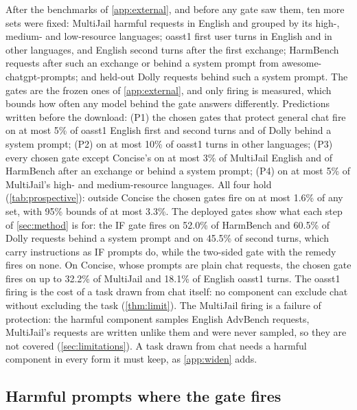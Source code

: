 \documentclass{article}
\theoremstyle{plain}
\theoremstyle{definition}
\theoremstyle{remark}
\newcommand{\resdir}{latex_v2_results}%
\newcommand{\placeholder}[1]{\begin{center}\fbox{\parbox[c][1.6cm][c]{0.9\linewidth}{\centering\small
  \textcolor{blue!60!black}{#1}}}\end{center}}
\newcommand{\inputor}[2]{\IfFileExists{#1}{}{\placeholder{#2}}}
\begin{document}
After the benchmarks of \cref{app:external}, and before any gate saw them, ten more sets were fixed: MultiJail harmful requests \citep{deng2024multilingual} in English and
grouped by its high-, medium- and low-resource languages; oasst1 first user turns \citep{kopf2023openassistant} in
English and in other languages, and English second turns after the first exchange; HarmBench requests after such an
exchange or behind a system prompt from awesome-chatgpt-prompts; and held-out Dolly requests behind such a system
prompt. The gates are the frozen ones of \cref{app:external}, and only firing is measured, which bounds how often any
model behind the gate answers differently. Predictions written before the download: (P1) the chosen gates that
protect general chat fire on at most 5\% of oasst1 English first and second turns and of Dolly behind a system
prompt; (P2) on at most 10\% of oasst1 turns in other languages; (P3) every chosen gate except Concise's on at most
3\% of MultiJail English and of HarmBench after an exchange or behind a system prompt; (P4) on at most 5\% of
MultiJail's high- and medium-resource languages. All four hold (\cref{tab:prospective}): outside Concise the chosen
gates fire on at most 1.6\% of any set, with 95\% bounds of at most 3.3\%. The deployed gates show what each step of
\cref{sec:method} is for: the IF gate fires on 52.0\% of HarmBench and 60.5\% of Dolly requests behind a system prompt
and on 45.5\% of second turns, which carry instructions as IF prompts do, while the two-sided gate with the remedy
fires on none. On Concise, whose prompts are plain chat requests, the chosen gate fires on up to 32.2\% of MultiJail
and 18.1\% of English oasst1 turns. The oasst1 firing is the cost of a task drawn from chat itself: no component can
exclude chat without excluding the task (\cref{thm:limit}). The MultiJail firing is a failure of protection: the
harmful component samples English AdvBench requests, MultiJail's requests are written unlike them and were never
sampled, so they are not covered (\cref{sec:limitations}). A task drawn from chat needs a harmful component in every
form it must keep, as \cref{app:widen} adds.

\inputor{\resdir/p3/prospective_table.tex}{Prospective sets table.}

\subsection{Harmful prompts where the gate fires}
\label{app:fired}
\end{document}
